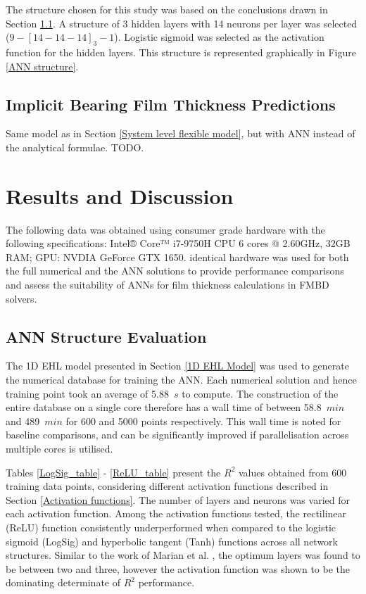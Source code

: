 The structure chosen for this study was based on the conclusions drawn in Section \ref{ANN Structure Evaluation Results}. A structure of 3 hidden layers with 14 neurons per layer was selected ($9-[14-14-14]_3-1$). Logistic sigmoid was selected as the activation function for the hidden layers. This structure is represented graphically in Figure \ref{ANN structure}.


\subsection{Implicit Bearing Film Thickness Predictions}

Same model as in Section \ref{System level flexible model}, but with ANN instead of the analytical formulae. TODO.



\section{Results and Discussion}

The following data was obtained using consumer grade hardware with the following specifications: 
Intel® Core™ i7-9750H CPU 6 cores @ 2.60GHz, 32GB RAM; GPU: NVDIA GeForce GTX 1650. identical hardware was used for both the full numerical and the ANN solutions to provide performance comparisons and assess the suitability of ANNs for film thickness calculations in FMBD solvers.

\subsection{ANN Structure Evaluation} \label{ANN Structure Evaluation Results}

The 1D EHL model presented in Section \ref{1D EHL Model} was used to generate the numerical database for training the ANN. Each numerical solution and hence training point took an average of 5.88~$s$ to compute. The construction of the entire database on a single core therefore has a wall time of between 58.8~$min$ and 489~$min$ for 600 and 5000 points respectively. This wall time is noted for baseline comparisons, and can be significantly improved if parallelisation across multiple cores is utilised.

Tables \ref{LogSig_table} - \ref{ReLU_table} present the $R^2$ values obtained from 600 training data points, considering different activation functions described in Section \ref{Activation functions}. The number of layers and neurons was varied for each activation function. Among the activation functions tested, the rectilinear (ReLU) function consistently underperformed when compared to the logistic sigmoid (LogSig) and hyperbolic tangent (Tanh) functions across all network structures.  Similar to the work of Marian et al. \cite{Marian2021}, the optimum layers was found to be between two and three, however the activation function was shown to be the dominating determinate of $R^2$ performance.

